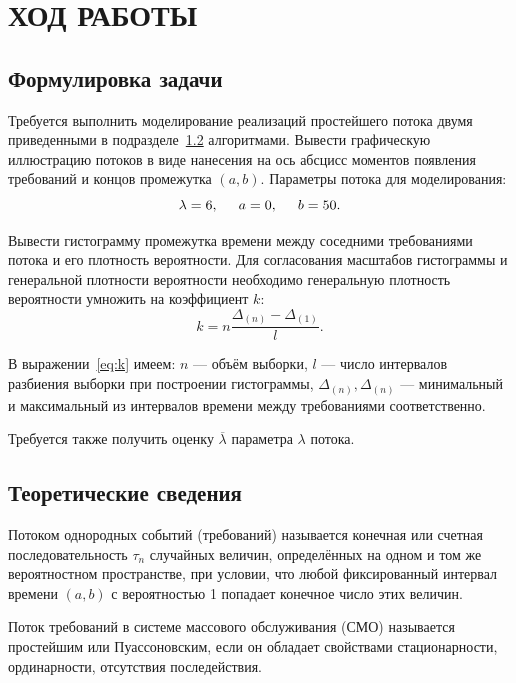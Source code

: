 \section{ХОД РАБОТЫ}

\subsection{Формулировка задачи}

Требуется выполнить моделирование реализаций простейшего потока двумя
приведенными в подразделе~\ref{subs:theory} алгоритмами. Вывести графическую
иллюстрацию потоков в виде нанесения на ось абсцисс моментов появления
требований и концов промежутка $(a,b)$. Параметры потока для моделирования:
\begin{equation*}
  \lambda = 6, \hspace{5mm} a = 0, \hspace{5mm} b = 50.
\end{equation*}

Вывести гистограмму промежутка времени между соседними требованиями потока
и его плотность вероятности. Для согласования масштабов гистограммы и генеральной
плотности вероятности необходимо генеральную плотность вероятности умножить на
коэффициент $k$:
\begin{equation}
\label{eq:k}
  k = n \dfrac{\Delta_{(n)} - \Delta_{(1)}}{l}.
\end{equation}

В выражении~\ref{eq:k} имеем: $n$ --- объём выборки, $l$ --- число интервалов разбиения
выборки при построении гистограммы, $ \Delta_{(n)}, \Delta_{(n)} $ ---
минимальный и максимальный из интервалов времени между требованиями соответственно.

Требуется также получить оценку $\overline{\lambda}$ параметра $\lambda$ потока.


\subsection{Теоретические сведения}
\label{subs:theory}

Потоком однородных событий (требований) называется конечная или счетная
последовательность $\tau_n$ случайных величин, определённых на одном и том же
вероятностном пространстве, при условии, что любой фиксированный интервал времени
$(a,b)$ с вероятностью 1 попадает конечное число этих величин.

Поток требований в системе массового обслуживания (СМО) называется простейшим
или Пуассоновским, если он обладает свойствами стационарности, ординарности,
отсутствия последействия.

